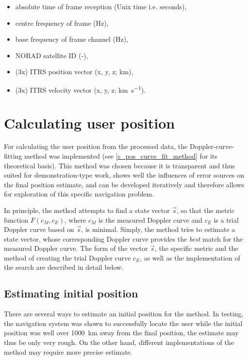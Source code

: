 \begin{itemize}
    \item absolute time of frame reception (Unix time i.e. seconds),
    \item centre frequency of frame (Hz),
    \item base frequency of frame channel (Hz),
    \item NORAD satellite ID (-),
    \item (3x) ITRS position vector (x, y, z; km),
    \item (3x) ITRS velocity vector (x, y, z; \unit{\km\per\s}).
\end{itemize}



\section{Calculating user position}
For calculating the user position from the processed data, the Doppler-curve-fitting method was implemented (see \autoref{s_pos_curve_fit_method} for its theoretical basis). This method was chosen because it is transparent and thus suited for demonstration-type work, shows well the influences of error sources on the final position estimate, and can be developed iteratively and therefore allows for exploration of this specific navigation problem.

In principle, the method attempts to find a state vector $\Vec{s}$, so that the metric function $F(c_M, c_E)$, where $c_M$ is the measured Doppler curve and $c_E$ is a trial Doppler curve based on $\Vec{s}$, is minimal. Simply, the method tries to estimate a state vector, whose corresponding Doppler curve provides the \textit{best} match for the measured Doppler curve. The form of the vector $\Vec{s}$, the specific metric and the method of creating the trial Doppler curve $c_E$, as well as the implementation of the search are described in detail below.

\subsection{Estimating initial position}
There are several ways to estimate an initial position for the method. In testing, the navigation system was shown to successfully locate the user while the initial position was well over \qty{1000}{km} away from the final position, the estimate may thus be only very rough. On the other hand, different implementations of the method may require more precise estimate.

